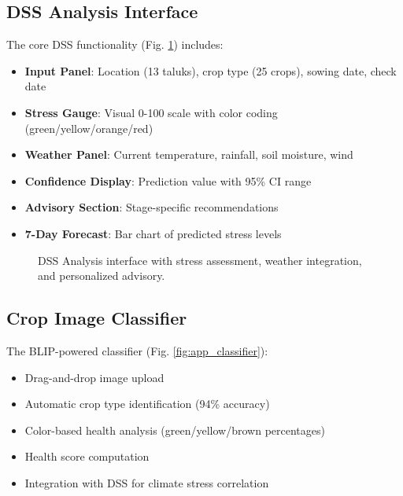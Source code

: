 \documentclass[journal,10pt,twoside]{IEEEtran}
\begin{document}
\subsection{DSS Analysis Interface}

The core DSS functionality (Fig. \ref{fig:app_dss}) includes:

\begin{itemize}
    \item \textbf{Input Panel}: Location (13 taluks), crop type (25 crops), sowing date, check date
    \item \textbf{Stress Gauge}: Visual 0-100 scale with color coding (green/yellow/orange/red)
    \item \textbf{Weather Panel}: Current temperature, rainfall, soil moisture, wind
    \item \textbf{Confidence Display}: Prediction value with 95\% CI range
    \item \textbf{Advisory Section}: Stage-specific recommendations
    \item \textbf{7-Day Forecast}: Bar chart of predicted stress levels
\end{itemize}

\begin{figure}[!t]
\centering
{}
\caption{DSS Analysis interface with stress assessment, weather integration, and personalized advisory.}
\label{fig:app_dss}
\end{figure}

\subsection{Crop Image Classifier}

The BLIP-powered classifier (Fig. \ref{fig:app_classifier}):

\begin{itemize}
    \item Drag-and-drop image upload
    \item Automatic crop type identification (94\% accuracy)
    \item Color-based health analysis (green/yellow/brown percentages)
    \item Health score computation
    \item Integration with DSS for climate stress correlation
\end{itemize}
\end{document}
